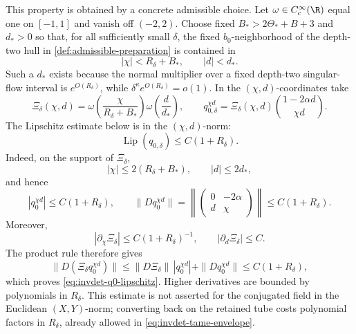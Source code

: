 This property is obtained by a concrete admissible choice.  Let
\(\omega\in C_c^\infty(\R)\) equal one on \([-1,1]\) and vanish off
\((-2,2)\).  Choose fixed \(B_*>2\Theta_*+B+3\) and \(d_*>0\) so that,
for all sufficiently small \(\delta\), the fixed \(b_0\)-neighborhood of
the depth-two hull in \cref{def:admissible-preparation} is contained in
\[
 |\chi|<R_\delta+B_*,\qquad |d|<d_*.
\]
Such a \(d_*\) exists because the normal multiplier over a fixed
depth-two singular-flow interval is \(e^{O(R_\delta)}\), while
\(\delta^\kappa e^{O(R_\delta)}=o(1)\).  In the
\((\chi,d)\)-coordinates take
\begin{equation}
 \Xi_\delta(\chi,d)
 =\omega\!\left(\frac{\chi}{R_\delta+B_*}\right)
  \omega\!\left(\frac d{d_*}\right),
 \qquad
 q_{0,\delta}^{\chi d}
 =\Xi_\delta(\chi,d)\binom{1-2\alpha d}{\chi d}.       \label{eq:invdet-explicit-q0-preparation}
\end{equation}
The Lipschitz estimate below is in the \((\chi,d)\)-norm:
\begin{equation}
 \operatorname{Lip}(q_{0,\delta})\leq C(1+R_\delta).  \label{eq:invdet-q0-lipschitz}
\end{equation}
Indeed, on the support of \(\Xi_\delta\),
\[
 |\chi|\leq2(R_\delta+B_*),\qquad |d|\leq2d_*,
\]
and hence
\[
 |q_0^{\chi d}|\leq C(1+R_\delta),\qquad
 \|Dq_0^{\chi d}\|
 =\left\|\begin{pmatrix}0&-2\alpha\\ d&\chi\end{pmatrix}\right\|
 \leq C(1+R_\delta).
\]
Moreover,
\[
 |\partial_\chi\Xi_\delta|\leq C(1+R_\delta)^{-1},
 \qquad
 |\partial_d\Xi_\delta|\leq C.
\]
The product rule therefore gives
\[
 \|D(\Xi_\delta q_0^{\chi d})\|
 \leq \|D\Xi_\delta\|\,|q_0^{\chi d}|
       +\|Dq_0^{\chi d}\|
 \leq C(1+R_\delta),
\]
which proves \cref{eq:invdet-q0-lipschitz}.  Higher derivatives are bounded
by polynomials in \(R_\delta\).  This estimate is not asserted for the
conjugated field in the Euclidean \((X,Y)\)-norm; converting back on the
retained tube costs polynomial factors in \(R_\delta\), already allowed in
\cref{eq:invdet-tame-envelope}.

